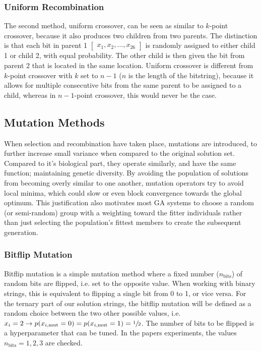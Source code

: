 \documentclass{article}
\begin{document}
\subsubsection*{Uniform Recombination}
\label{subsubsec:ga_rec_uc}
\vspace{-0.2cm}
The second method, uniform crossover, can be seen as similar to $k$-point crossover, because it also produces two children from two parents.
The distinction is that each bit in parent 1 $\begin{bmatrix} x_1, x_2, \dots, x_26 \end{bmatrix}$ is randomly assigned to either child 1 or child 2, with equal probability.
The other child is then given the bit from parent 2 that is located in the same location.
Uniform crossover is different from $k$-point crossover with $k$ set to $n-1$ ($n$ is the length of the bitstring), because it allows for multiple consecutive bits from the same parent to be assigned to a child, whereas in $n-1$-point crossover, this would never be the case.

\subsection{Mutation Methods}
\label{subsec:ga_mut}

When selection and recombination have taken place, mutations are introduced, to further increase small variance when compared to the original solution set. 
Compared to it's biological part, they operate similarly, and have the same function; maintaining genetic diversity. 
By avoiding the population of solutions from becoming overly similar to one another, mutation operators try to avoid local minima, which could slow or even block convergence towards the global optimum.
This justification also motivates most GA systems to choose a random (or semi-random) group with a weighting toward the fitter individuals rather than just selecting the population's fittest members to create the subsequent generation.


\subsubsection*{Bitflip Mutation}
\label{subsubsec:ga_mut_bf}
\vspace{-0.2cm}
Bitflip mutation is a simple mutation method where a fixed number ($n_{\mathrm{bits}}$) of random bits are flipped, i.e. set to the opposite value.
When working with binary strings, this is equivalent to flipping a single bit from 0 to 1, or vice versa.
For the ternary part of our solution strings, the bitflip mutation will be defined as a random choice between the two other possible values, i.e. $ x_i = 2 \rightarrow p(x_{i,\mathrm{mut}} = 0) = p(x_{i, \mathrm{mut}} = 1) = \sfrac{1}{2}$.
The number of bits to be flipped is a hyperparameter that can be tuned.
In the papers experiments, the values $n_{\mathrm{bits}}=1, 2, 3$ are checked.
\end{document}
